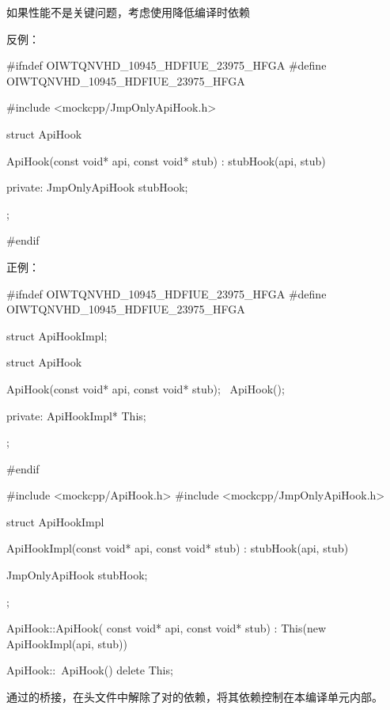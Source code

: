 \begin{content}
\begin{advise}
如果性能不是关键问题，考虑使用降低编译时依赖
\end{advise}

反例：
\begin{leftbar}
\begin{c++}[caption={\ttfamily{mockcpp/ApiHook.h}}]
#ifndef OIWTQNVHD_10945_HDFIUE_23975_HFGA
#define OIWTQNVHD_10945_HDFIUE_23975_HFGA

#include <mockcpp/JmpOnlyApiHook.h>

struct ApiHook
{
    ApiHook(const void* api, const void* stub)
      : stubHook(api, stub)
    {}

private:
    JmpOnlyApiHook stubHook;
};

#endif
\end{c++}
\end{leftbar}

正例：
\begin{leftbar}
\begin{c++}[caption={\ttfamily{mockcpp/ApiHook.h}}]
#ifndef OIWTQNVHD_10945_HDFIUE_23975_HFGA
#define OIWTQNVHD_10945_HDFIUE_23975_HFGA

struct ApiHookImpl;

struct ApiHook
{
    ApiHook(const void* api, const void* stub);
    ~ApiHook();

private:
    ApiHookImpl* This;
};

#endif
\end{c++}
\end{leftbar}

\begin{leftbar}
\begin{c++}[caption={\ttfamily{mockcpp/ApiHook.cpp}}]
#include <mockcpp/ApiHook.h>
#include <mockcpp/JmpOnlyApiHook.h>

struct ApiHookImpl
{
   ApiHookImpl(const void* api, const void* stub)
     : stubHook(api, stub)
   {
   }

   JmpOnlyApiHook stubHook;
};

ApiHook::ApiHook( const void* api, const void* stub)
  : This(new ApiHookImpl(api, stub))
{
}

ApiHook::~ApiHook()
{
    delete This;
}
\end{c++}
\end{leftbar}

通过的桥接，在头文件中解除了对的依赖，将其依赖控制在本编译单元内部。

\end{content}

